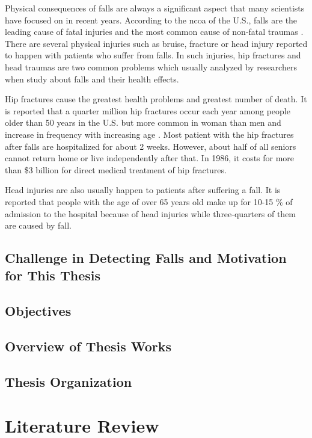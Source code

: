 \documentclass[letterpaper,12pt,titlepage,oneside,final]{book}
\begin{document}
Physical consequences of falls are always a significant aspect that many scientists have focused on in recent years. According to the \gls{ncoa} of the U.S., falls are the leading cause of fatal injuries and the most common cause of non-fatal traumas \cite{ncoa}. There are several physical injuries such as bruise, fracture or head injury reported to happen with patients who suffer from falls. In such injuries, hip fractures and head traumas are two common problems which usually analyzed by researchers when study about falls and their health effects. \par
Hip fractures cause the greatest health problems and greatest number of death. It is reported that a quarter million hip fractures occur each year among people older than 50 years in the U.S. but more common in woman than men and increase in frequency with increasing age \cite{bibli_book} \cite{medicinenet_fracture}. Most patient with the hip fractures after falls are hospitalized for about 2 weeks. However, about half of all seniors cannot return home or live independently after that. In 1986, it costs for more than \$3 billion for direct medical treatment of hip fractures.\par 
Head injuries are also usually happen to patients after suffering a fall. It is reported that people with the age of over 65 years old make up for 10-15 \% of admission to the hospital because of head injuries while three-quarters of them are caused by fall.  
\section{Challenge in Detecting Falls and Motivation for This Thesis}

\section{Objectives}

\section{Overview of Thesis Works}

\section{Thesis Organization}

\chapter{Literature Review}
\end{document}
